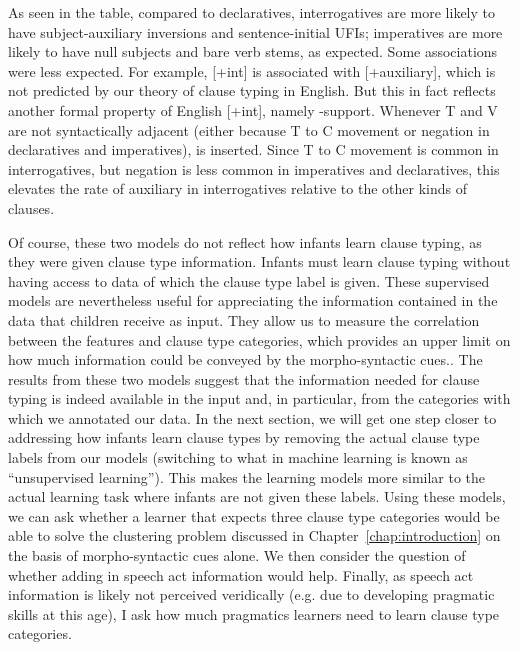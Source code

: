 As seen in the table, compared to declaratives, interrogatives are more likely to have subject-auxiliary inversions and sentence-initial UFIs; imperatives are more likely to have null subjects and bare verb stems, as expected. Some associations were less expected. For example, [+int] is associated with [+auxiliary], which is not predicted by our theory of clause typing in English. But this in fact reflects another formal property of English [+int], namely -support. Whenever T and V are not syntactically adjacent (either because T to C movement or negation in declaratives and imperatives),  is inserted. Since T to C movement is common in interrogatives, but negation is less common in imperatives and declaratives, this elevates the rate of auxiliary in interrogatives relative to the other kinds of clauses. %


Of course, these two models do not reflect how infants learn clause typing, as they were given clause type information. Infants must learn clause typing without having access to data of which the clause type label is given. These supervised models are nevertheless useful for appreciating the information contained in the data that children receive as input. They allow us to measure the correlation between the features and clause type categories, which provides an upper limit on how much information could be conveyed by the morpho-syntactic cues.. The results from these two models suggest that the information needed for clause typing is indeed available in the input and, in particular, from the categories with which we annotated our data. In the next section, we will get one step closer to addressing how infants learn clause types by removing the actual clause type labels from our models (switching to what in machine learning is known as ``unsupervised learning''). This makes the learning models more similar to the actual learning task where infants are not given these labels. Using these models, we can ask whether a learner that expects three clause type categories would be able to solve the clustering problem discussed in Chapter~\ref{chap:introduction} on the basis of morpho-syntactic cues alone. We then consider the question of whether adding in speech act information would help. Finally, as speech act information is likely not perceived veridically (e.g. due to developing pragmatic skills at this age), I ask how much pragmatics learners need to learn clause type categories. 


